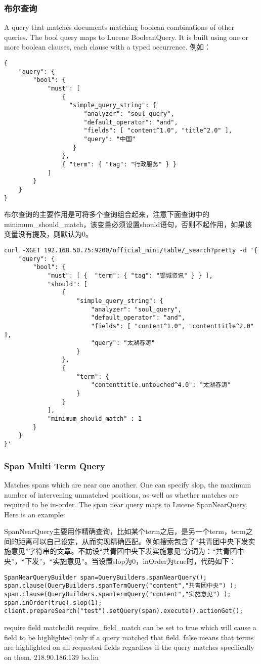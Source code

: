 \subsubsection{布尔查询}
A query that matches documents matching boolean combinations of other queries. The bool query maps to Lucene BooleanQuery. It is built using one or more boolean clauses, each clause with a typed occurrence. 例如：
\begin{verbatim}
{
    "query": {
        "bool": {
            "must": [
                {
                  "simple_query_string": {
                      "analyzer": "soul_query", 
                      "default_operator": "and", 
                      "fields": [ "content^1.0", "title^2.0" ], 
                      "query": "中国"
                   }
                }, 
                { "term": { "tag": "行政服务" } }
            ]
        }
    } 
}
\end{verbatim}
\par 布尔查询的主要作用是可将多个查询组合起来，注意下面查询中的minimum\_should\_match，该变量必须设置should语句，否则不起作用，如果该变量没有提及，则默认为0。
\begin{verbatim}
curl -XGET 192.168.50.75:9200/official_mini/table/_search?pretty -d '{
    "query": {
        "bool": {
            "must": [ {  "term": { "tag": "锡城资讯" } } ], 
            "should": [
                {
                    "simple_query_string": {
                        "analyzer": "soul_query", 
                        "default_operator": "and", 
                        "fields": [ "content^1.0", "contenttitle^2.0" ], 
                        "query": "太湖春涛"
                    }
                }, 
                {
                    "term": {
                        "contenttitle.untouched^4.0": "太湖春涛"
                    }
                }
            ], 
            "minimum_should_match" : 1
        }
    } 
}'
\end{verbatim}
\subsubsection{Span Multi Term Query}
\par Matches spans which are near one another. One can specify slop, the maximum number of intervening unmatched positions, as well as whether matches are required to be in-order. The span near query maps to Lucene SpanNearQuery. Here is an example:
\par SpanNearQuery主要用作精确查询，比如某个term之后，是另一个term，term之间的距离可以自己设定，从而实现精确匹配。例如搜索包含了“共青团中央下发实施意见”字符串的文章。不妨设“共青团中央下发实施意见”分词为：“共青团中央”，“下发”，“实施意见”。当设置slop为0，inOrder为true时，代码如下：
\begin{verbatim}
SpanNearQueryBuilder span=QueryBuilders.spanNearQuery();
span.clause(QueryBuilders.spanTermQuery("content","共青团中央") );
span.clause(QueryBuilders.spanTermQuery("content","实施意见") );
span.inOrder(true).slop(1);
client.prepareSearch("test").setQuery(span).execute().actionGet();
\end{verbatim}

require field matchedit
require\_field\_match can be set to true which will cause a field to be highlighted only if a query matched that field. false means that terms are highlighted on all requested fields regardless if the query matches specifically on them.
218.90.186.139
bo.liu